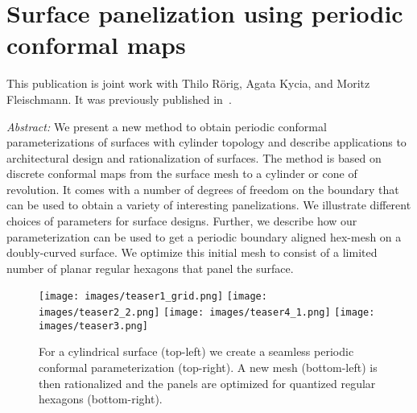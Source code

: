 \documentclass[Thesis.tex]{subfiles}
\begin{document}
\chapter{Surface panelization using periodic conformal maps}
\label{chp:periodic_conformal_maps}

This publication is joint work with Thilo R\"orig, Agata Kycia, and 
Moritz Fleischmann. It was previously published in~\cite{Roerig2014}.

\emph{Abstract:} 
We present a new method to obtain periodic conformal parameterizations of
surfaces with cylinder topology and describe applications to
architectural design and rationalization of surfaces. The method is
based on discrete conformal maps from the surface mesh to a cylinder or
cone of revolution. It comes with a number of degrees of freedom on
the boundary that can be used to obtain a variety of interesting
panelizations. We illustrate different choices of parameters for
\nurbs surface designs. Further, we describe how our parameterization
can be used to get a periodic boundary aligned hex-mesh on a
doubly-curved surface. We optimize this initial mesh to consist of a
limited number of planar regular hexagons that panel the surface.

\begin{figure}
  \centering
  \texttt{[image: images/teaser1\_grid.png]}
  \texttt{[image: images/teaser2\_2.png]}
  \texttt{[image: images/teaser4\_1.png]}
  \texttt{[image: images/teaser3.png]}
  \caption{For a cylindrical \nurbs surface (top-left) we create a
    seamless periodic conformal parameterization (top-right). A new
    mesh (bottom-left) is then rationalized and the panels are
    optimized for quantized regular hexagons (bottom-right).}
  \label{fig:teaser}
\end{figure}

\def\subfilebibliography{}









\subfilebibliographytwo
\end{document}
